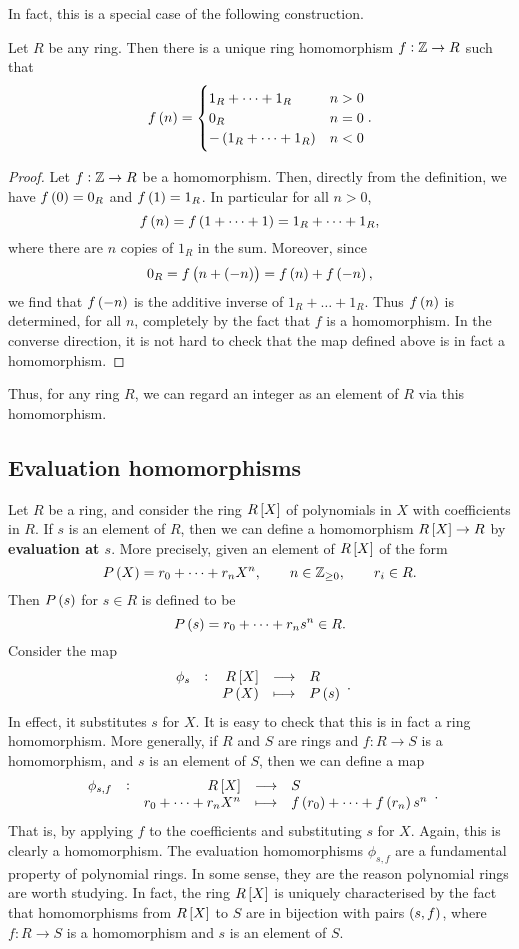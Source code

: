 In fact, this is a special case of the following construction.

\begin{proposition}
Let $ R $ be any ring. Then there is a unique ring homomorphism $ f : \mathbb{Z} \to R $ such that
$$ f\br{n} =
\begin{cases}
1_R + \dots + 1_R & n > 0 \\
0_R & n = 0 \\
-\br{1_R + \dots + 1_R} & n < 0
\end{cases}.
$$
\end{proposition}

\begin{proof}
Let $ f : \mathbb{Z} \to R $ be a homomorphism. Then, directly from the definition, we have $ f\br{0} = 0_R $ and $ f\br{1} = 1_R $. In particular for all $ n > 0 $,
$$ f\br{n} = f\br{1 + \dots + 1} = 1_R + \dots + 1_R, $$
where there are $ n $ copies of $ 1_R $ in the sum. Moreover, since
$$ 0_R = f\br{n + \br{-n}} = f\br{n} + f\br{-n}, $$
we find that $ f\br{-n} $ is the additive inverse of $ 1_R + \dots + 1_R $. Thus $ f\br{n} $ is determined, for all $ n $, completely by the fact that $ f $ is a homomorphism. In the converse direction, it is not hard to check that the map defined above is in fact a homomorphism.
\end{proof}

Thus, for any ring $ R $, we can regard an integer as an element of $ R $ via this homomorphism.

\pagebreak

\subsection{Evaluation homomorphisms}

Let $ R $ be a ring, and consider the ring $ R\sbr{X} $ of polynomials in $ X $ with coefficients in $ R $. If $ s $ is an element of $ R $, then we can define a homomorphism $ R\sbr{X} \to R $ by \textbf{evaluation at $ s $}. More precisely, given an element of $ R\sbr{X} $ of the form
$$ P\br{X} = r_0 + \dots + r_nX^n, \qquad n \in \ZZ_{\ge 0}, \qquad r_i \in R. $$
Then $ P\br{s} $ for $ s \in R $ is defined to be
$$ P\br{s} = r_0 + \dots + r_ns^n \in R. $$
Consider the map
$$ \function[\phi_s]{R\sbr{X}}{R}{P\br{X}}{P\br{s}}. $$
In effect, it substitutes $ s $ for $ X $. It is easy to check that this is in fact a ring homomorphism. More generally, if $ R $ and $ S $ are rings and $ f : R \to S $ is a homomorphism, and $ s $ is an element of $ S $, then we can define a map
$$ \function[\phi_{s, f}]{R\sbr{X}}{S}{r_0 + \dots + r_nX^n}{f\br{r_0} + \dots + f\br{r_n}s^n}. $$
That is, by applying $ f $ to the coefficients and substituting $ s $ for $ X $. Again, this is clearly a homomorphism. The evaluation homomorphisms $ \phi_{s, f} $ are a fundamental property of polynomial rings. In some sense, they are the reason polynomial rings are worth studying. In fact, the ring $ R\sbr{X} $ is uniquely characterised by the fact that homomorphisms from $ R\sbr{X} $ to $ S $ are in bijection with pairs $ \br{s, f} $, where $ f : R \to S $ is a homomorphism and $ s $ is an element of $ S $.

